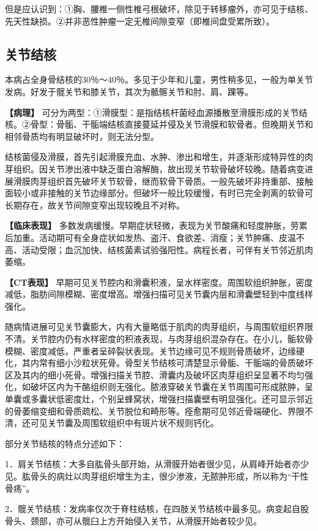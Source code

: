 但是应认识到：①胸、腰椎一侧性椎弓根破坏，除见于转移瘤外，亦可见于结核、先天性缺损。②并非恶性肿瘤一定无椎间隙变窄（即椎间盘受累所致）。

\subsection{关节结核}

本病占全身骨结核的30％～40％。多见于少年和儿童，男性稍多见，一般为单关节发病。好发于髋关节和膝关节，其次为骶髂关节和肘、肩、踝等。

\textbf{【病理】}
可分为两型：①滑膜型：是指结核杆菌经血源播散至滑膜形成的关节结核。②骨型：骨骺、干骺端结核直接蔓延并侵及关节滑膜和软骨者。但晚期关节和相邻骨质均有明显破坏时，则无法分型。

结核菌侵及滑膜，首先引起滑膜充血、水肿、渗出和增生，并逐渐形成特异性的肉芽组织。因关节渗出液中缺乏蛋白溶解酶，故出现关节软骨破坏较晚。随着病变进展滑膜肉芽组织首先破坏关节软骨，继而软骨下骨质。一般先破坏非持重部、接触面较小或非接触的关节边缘部分。但破坏一般比较缓慢，有时已完全剥离的软骨可长期存在，故关节间隙变窄出现较晚且不对称。

\textbf{【临床表现】}
多数发病缓慢。早期症状轻微，表现为关节酸痛和轻度肿胀，劳累后加重。活动期可有全身症状如发热、盗汗、食欲差、消瘦；关节肿痛、皮温不高、活动受限；血沉加快、结核菌素试验强阳性。病程长者，可伴有关节邻近肌肉萎缩。

\textbf{【CT表现】}
早期可见关节腔内和滑囊积液，呈水样密度。周围软组织肿胀，密度减低，脂肪间隙模糊、密度增高。增强扫描可见关节囊内层和滑囊壁轻到中度线样强化。

随病情进展可见关节囊膨大，内有大量略低于肌肉的肉芽组织，与周围软组织界限不清。关节腔内仍有水样密度的积液表现，与肉芽组织混杂存在。在小儿，骺软骨模糊、密度减低，严重者呈碎裂状表现。关节边缘可见不规则骨质破坏，边缘硬化，其内常有细小沙粒状死骨。骨型关节结核可清楚显示骨骺、干骺端的骨质破坏区及其内的细小死骨。增强扫描关节腔、滑囊内及破坏区肉芽组织呈显著不均匀强化，如破坏区内为干酪组织则无强化。脓液穿破关节囊在关节周围可形成脓肿，呈单囊或多囊状低密度灶，个别呈蜂窝状，增强扫描囊壁有明显强化。还可显示邻近的骨萎缩变细和骨质疏松、关节脱位和畸形等。痊愈期可见邻近骨端硬化、界限不清，还可见关节囊及周围软组织中有斑片状不规则钙化。

部分关节结核的特点分述如下：

1．肩关节结核：大多自肱骨头部开始，从滑膜开始者很少见，从肩峰开始者亦少见。肱骨头的病灶以肉芽组织增生为主，很少渗液，无脓肿形成，所以称为“干性骨疡”。

2．髋关节结核：发病率仅次于脊柱结核，在四肢关节结核中最多见。病变起自股骨头、颈部，亦可从髋臼上方开始侵入关节，从滑膜开始者较少见。

